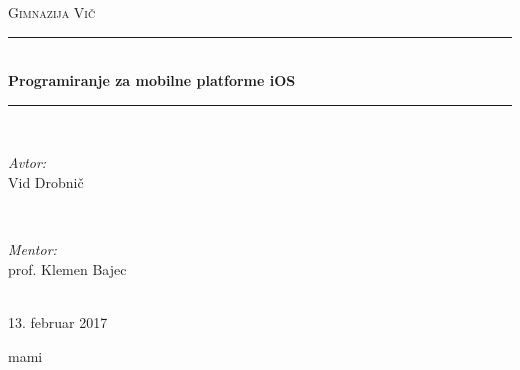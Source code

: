 \documentclass[a4paper, 12pt]{article}
\begin{document}
	\begin{titlepage}
		\newcommand{\HRule}{\rule{\linewidth}{0.5mm}}
		\center
		
		\textsc{\LARGE Gimnazija Vič}\\[2cm]

		\HRule \\[0.4cm]
		{ \huge \bfseries Programiranje za mobilne platforme iOS}\\[0.4cm] %
		\HRule \\[1.5cm]
		
		\begin{minipage}{0.4\textwidth}
			\begin{flushleft} \large
				\emph{Avtor:}\\
				Vid Drobnič %
			\end{flushleft}
		\end{minipage}
		~
		\begin{minipage}{0.4\textwidth}
			\begin{flushright} \large
				\emph{Mentor:} \\
				prof. Klemen Bajec %
			\end{flushright}
		\end{minipage}\\[4cm]
		
		{\large 13. februar 2017}\\[3cm] %
		\vfill %
	\end{titlepage}
	
	mami
\end{document}
